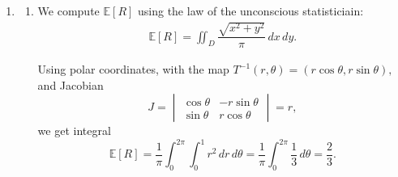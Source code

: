 \documentclass[12pt]{article}
\begin{document}
\begin{enumerate}
\begin{enumerate}
\begin{figure}[h]
          \caption{Marginal density of $X$ when $(X,Y)$ is uniform on
          the unit disc.}
        \end{figure}

      \item The friend is applying the factorization theorem.
        However, the factorisation theorem requires the factorization
        to hold over all of $\mathbb R^2,$ but the given
        factorization is only valid over $D.$ Hence, it can't be applied.

      \item Here, the argument would work because we can find such
        $g, h$ with definition
        $$
        g(x) = \mathbbm 1_{[-1/2, 1/2]}(x), \qquad \mathbbm 1_{[-1/2, 1/2]}(y)
        $$
        that factor the density.
    \end{enumerate}

  \item
    \begin{enumerate}
      \item We compute $\mathbb E[R]$ using the law of the
        unconscious statisticiain:
        \begin{align*}
          \mathbb E[R] = \iint_{D} \dfrac{\sqrt{x^2 + y^2}}{\pi} \, dx \, dy.
        \end{align*}

        Using polar coordinates, with the map $T^{-1}(r, \theta) = (r
        \cos \theta, r \sin \theta),$ and Jacobian
        $$
        J =
        \begin{vmatrix}
          \cos \theta & -r \sin \theta  \\
          \sin \theta & r \cos \theta
        \end{vmatrix} = r,
        $$
        we get integral
        $$
        \mathbb E[R] = \dfrac{1}\pi{}\int_{0}^{2\pi} \int_{0}^{1} r^2
        \, dr \, d\theta = \dfrac{1}{\pi} \int_{0}^{2\pi}
        \dfrac{1}{3} \, d\theta = \dfrac{2}{3}.
        $$


\end{enumerate}
\end{enumerate}
\end{document}
